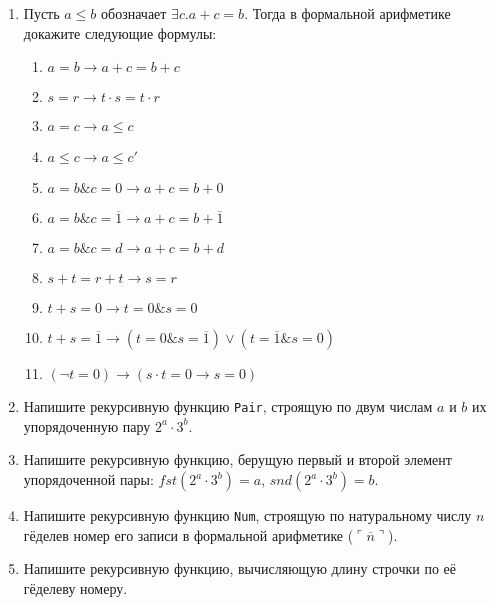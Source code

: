 \documentclass[10pt,a4paper,oneside]{article}
\begin{document}
\begin{enumerate}

\item
Пусть $a \le b$ обозначает $\exists c.a+c = b$. Тогда в формальной арифметике докажите следующие формулы:
\begin{enumerate}
\item $a=b \rightarrow a+c=b+c$
\item $s = r \rightarrow t \cdot s = t \cdot r$
\item $a=c \rightarrow a \le c$
\item $a \le c \rightarrow a \le c'$
\item $a=b \& c=0 \rightarrow a+c=b+0$
\item $a=b \& c=\overline{1} \rightarrow a+c=b+\overline{1}$
\item $a=b \& c=d \rightarrow a+c=b+d$
\item $s + t = r + t \rightarrow s = r$
\item $t+s=0 \rightarrow t = 0 \& s = 0$
\item $t+s=\overline{1} \rightarrow (t=0 \& s=\overline{1}) \vee (t=\overline{1} \& s = 0)$
\item $(\neg t = 0) \rightarrow (s \cdot t = 0 \rightarrow s = 0)$
\end{enumerate}

\item Напишите рекурсивную функцию \verb!Pair!, строящую по двум числам $a$ и $b$ их упорядоченную 
пару $2^a \cdot 3^b$.

\item Напишите рекурсивную функцию, берущую первый и второй элемент упорядоченной пары:
$fst(2^a \cdot 3^b) = a$, $snd(2^a \cdot 3^b) = b$.

\item Напишите рекурсивную функцию \verb!Num!, строящую по натуральному числу $n$ гёделев номер
его записи в формальной арифметике ($\ulcorner\overline{n}\urcorner$).

\item Напишите рекурсивную функцию, вычисляющую длину строчки по её гёделеву номеру.

\end{enumerate}
\end{document}
